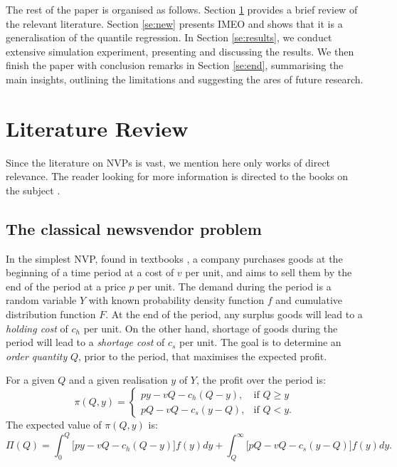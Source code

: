 \documentclass[a4paper,11pt]{article}
\begin{document}

The rest of the paper is organised as follows. Section \ref{se:lit} provides a brief review of the relevant literature. Section \ref{se:new} presents IMEO and shows that it is a generalisation of the quantile regression. In Section \ref{se:results}, we conduct extensive simulation experiment, presenting and discussing the results. We then finish the paper with conclusion remarks in Section \ref{se:end}, summarising the main insights, outlining the limitations and suggesting the ares of future research.

\section{Literature Review} \label{se:lit}

Since the literature on NVPs is vast, we mention here only works of direct relevance. The reader looking for more information is directed to the books on the subject \cite{Ch12,Po02,SPP98,Zi00}.

\subsection{The classical newsvendor problem} %

In the simplest NVP, found in textbooks \cite{Ch12}, a company purchases goods at the beginning of a time period at a cost of $v$ per unit, and aims to sell them by the end of the period at a price $p$ per unit. The demand during the period is a random variable $Y$ with known probability density function $f$ and cumulative distribution function $F$. At the end of the period, any surplus goods will lead to a \emph{holding cost} of $c_h$ per unit. On the other hand, shortage of goods during the period will lead to a \emph{shortage cost} of $c_s$ per unit. The goal is to determine an \emph{order quantity} $Q$, prior to the period, that maximises the expected profit.

For a given $Q$ and a given realisation $y$ of $Y$, the profit over the period is:
\[
    \pi(Q,y)=
    \begin{cases}
        py-vQ-c_h(Q-y),& \text{if } Q\geq y\\
        pQ-vQ-c_s(y-Q),& \text{if } Q< y.
    \end{cases}
\]
The expected value of $\pi(Q,y)$ is:
\[
    \Pi(Q) = \int_{0}^{Q} \big[ py-vQ-c_h(Q-y) \big] f(y)dy + \int_{Q}^{\infty} \big[ pQ-vQ-c_s(y-Q) \big] f(y)dy.
\]
\end{document}
